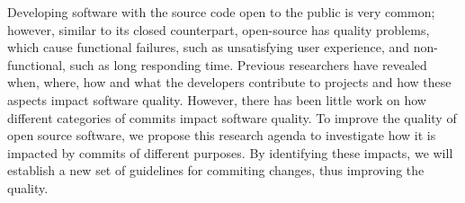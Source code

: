 Developing software with the source code open to the public is very common; however, similar to its closed counterpart, open-source has quality problems, which cause functional failures, such as unsatisfying user experience, and non-functional, such as long responding time.
Previous researchers have revealed when, where, how and what the developers contribute to projects and how these aspects impact software quality. 
However, there has been little work on how different categories of commits impact software quality.
To improve the quality of open source software, we propose this research agenda to investigate how it is impacted by commits of different purposes.
By identifying these impacts, we will establish a new set of guidelines for commiting changes, thus improving the quality.
